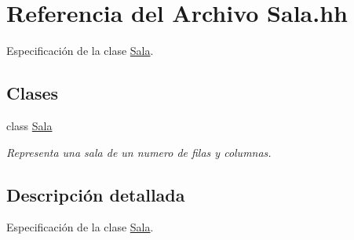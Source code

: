 \hypertarget{_sala_8hh}{}\section{Referencia del Archivo Sala.\+hh}
\label{_sala_8hh}


Especificación de la clase \hyperlink{class_sala}{Sala}.  


\subsection*{Clases}
\begin{DoxyCompactItemize}
\item 
class \hyperlink{class_sala}{Sala}
\begin{DoxyCompactList}\small\item\em Representa una sala de un numero de filas y columnas. \end{DoxyCompactList}\end{DoxyCompactItemize}


\subsection{Descripción detallada}
Especificación de la clase \hyperlink{class_sala}{Sala}. 

